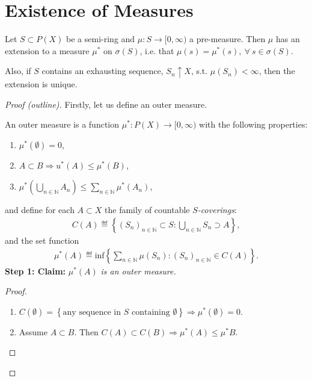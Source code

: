\section{Existence of Measures}
\begin{theorem}[Carathéodory]
    Let \(S\subset P(X)\) be a semi-ring and \(\mu:S\rightarrow[0,\infty)\) a pre-measure. Then \(\mu\) has an extension to a measure \(\mu^{*}\)
    on \(\sigma(S)\), i.e. that \(\mu(s) = \mu^{*}(s), \ \forall \ s\in \sigma(S)\). 
    
    Also, if \(S\) contains an exhausting sequence, \(S_n\uparrow X\), s.t. \(\mu(S_n) < \infty\), then the extension is 
    unique.
\end{theorem}
\begin{proof}[Proof (outline)]
    Firstly, let us define an outer measure. 
    \begin{definition}
        An outer measure is a function \(\mu^{*}: P(X) \rightarrow [0,\infty)\) with the following properties:
        \begin{enumerate}
            \item \(\mu^{*}(\emptyset) = 0\),
            \item \(A\subset B \Rightarrow u^{*}(A) \leq \mu^{*}(B)\),
            \item \(\mu^{*}\left( \bigcup\limits_{n\in\mathbb{N}} A_n \right)\leq \sum\limits_{n\in\mathbb{N}} \mu^{*}(A_n)\),
        \end{enumerate}
    \end{definition}
    and define for each \(A\subset X\) the family of countable \(S\)\emph{-coverings}:
    \begin{align*}
        C(A) \eqdef \left\{(S_n)_{n\in\mathbb{N}} \subset S : \bigcup\limits_{n\in\mathbb{N}} S_n\supset A\right\},
    \end{align*}
    and the set function
    \begin{align*}
        \mu^{*}(A) \eqdef \text{inf}\left\{ \sum\limits_{n\in\mathbb{N}} \mu(S_n): (S_n)_{n\in\mathbb{N}}\in C(A)\right\}.
    \end{align*}
    \textbf{Step 1: Claim: } \(\mu^{*}(A)\)\emph{ is an outer measure.}
    \begin{proof} \ \\
        \begin{enumerate}
            \item \(C(\emptyset) = \left\{ \text{any sequence in }S\text{ containing }\emptyset  \right\}\Rightarrow \mu^{*}(\emptyset) = 0\).
            \item Assume \(A\subset B\). Then \(C(A) \subset C(B) \Rightarrow \mu^{*}(A) \leq \mu^{*}{B}\).

\end{enumerate}
\end{proof}
\end{proof}
